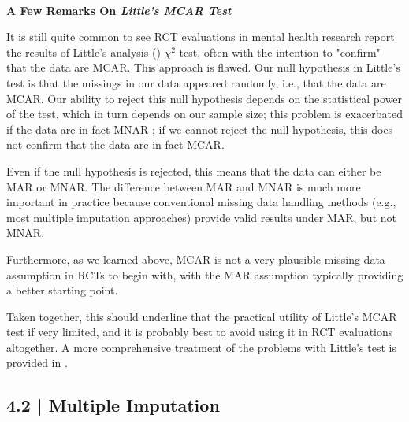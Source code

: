 \begin{box-important} \\
\textcolor{burgundyred}{\textbf{A Few Remarks On \emph{Little's MCAR Test}}} 

\vspace{2mm}

It is still quite common to see RCT evaluations in mental health research report the results of Little's analysis (\citeyear{little1988test}) $\chi^2$ test, often with the intention to "confirm" that the data are MCAR. This approach is flawed. Our null hypothesis in Little's test is that the missings in our data appeared randomly, i.e., that the data are MCAR. Our ability to reject this null hypothesis depends on the statistical power of the test, which in turn depends on our sample size; this problem is exacerbated if the data are in fact MNAR \citep{thoemmes2007structural}; if we cannot reject the null hypothesis, this does not confirm that the data are in fact MCAR. 

\vspace{2mm}

\hspace*{5mm} Even if the null hypothesis is rejected, this means that the data can either be MAR or MNAR. The difference between MAR and MNAR is much more important in practice because conventional missing data handling methods (e.g., most multiple imputation approaches) provide valid results under MAR, but not MNAR.

\end{box-important}
\begin{box-important-continued}

Furthermore, as we learned above, MCAR is not a very plausible missing data assumption in RCTs to begin with, with the MAR assumption typically providing a better starting point. 

\vspace{2mm}

\hspace*{5mm} Taken together, this should underline that the practical utility of Little's MCAR test if very limited, and it is probably best to avoid using it in RCT evaluations altogether. A more comprehensive treatment of the problems with Little's test is provided in \citet[][p.21]{enders2010applied}. 

\end{box-important-continued}


\subsection{{\normalfont\textsf{\textcolor{sBlue}{\small 4.2 |}}} Multiple Imputation}

